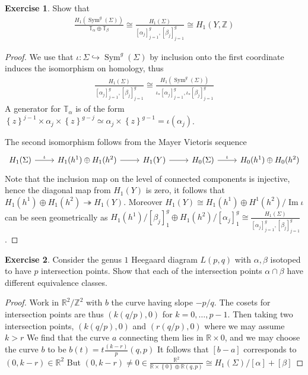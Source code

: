 \documentclass[10.5pt]{article}
\theoremstyle{definition}
\newtheorem{pb}{Exercise}
\numberwithin{proposition}{subsection}
\numberwithin{pb}{subsection}
\newcommand{\set}[1]{\left\{#1\right\}}
\begin{document}
    \begin{pb}
        Show that
        \begin{align}
            \frac{H_1(\operatorname{Sym}^g(\Sigma))}{\mathbb{T}_\alpha \oplus \mathbb{T}_\beta} \cong \frac{H_1(\Sigma)}{[\alpha_j]_{j=1}^g, [\beta_j]_{j=1}^g} \cong H_1(Y,\mathbb{Z})
        \end{align}
        \begin{proof}
            We use that \(\iota: \Sigma \hookrightarrow \operatorname{Sym}^g(\Sigma)\) by inclusion onto the first coordinate induces the isomorphism on homology, thus
            \begin{align}
                \frac{H_1(\Sigma)}{[\alpha_j]_{j=1}^g, [\beta_j]_{j=1}^g} \cong \frac{H_1(\operatorname{Sym}^g(\Sigma))}{\iota_*[\alpha_j]_{j=1}^g, \iota_*[\beta_j]_{j=1}^g}
            \end{align}
            A generator for \(\mathbb{T}_\alpha\) is of the form \(\set{z}^{j-1}\times \alpha_j \times \set{z}^{g-j} \simeq \alpha_j \times \set{z}^{g-1} = \iota(\alpha_j)\).

            The second isomorphism follows from the Mayer Vietoris sequence
            \begin{equation}\begin{tikzcd}
                H_1(\Sigma) \arrow[r, "\iota"] &H_1(h^1) \oplus H_1(h^2) \arrow[r] &H_1(Y) \arrow[r] &H_0(\Sigma) \arrow[r, "\iota"] &H_0(h^1) \oplus H_0(h^2)
            \end{tikzcd}\end{equation}
            Note that the inclusion map on the level of connected components is injective, hence the diagonal map from \(H_1(Y)\) is zero, it follows that \(H_1(h^1) \oplus H_1(h^2) \twoheadrightarrow H_1(Y)\). Moreover \(H_1(Y) \cong H_1(h^1) \oplus H^1(h^2)/\operatorname{Im}\iota\) can be seen geometrically as \(H_1(h^1)/[\beta_j]_1^g \oplus H_1(h^2)/[\alpha_j]_1^g \cong \frac{H_1(\Sigma)}{[\alpha_j]_{j=1}^g, [\beta_j]_{j=1}^g}\).
        \end{proof}
    \end{pb}

    \begin{pb}
        Consider the genus \(1\) Heegaard diagram \(L(p,q)\) with \(\alpha,\beta\) isotoped to have \(p\) intersection points. Show that each of the intersection points \(\alpha \cap \beta\) have different equivalence classes.

        \begin{proof}
            Work in \(\mathbb{R}^2/\mathbb{Z}^2\) with \(b\) the curve having slope \(-p/q\). The cosets for intersection points are thus \((k(q/p),0)\) for \(k=0,\hdots,p-1\). Then taking two intersection points, \((k(q/p),0)\) and \((r(q/p),0)\) where we may assume \(k>r\) We find that the curve \(a\) connecting them lies in \(\mathbb{R} \times 0\), and we may choose the curve \(b\) to be \(b(t) = t\frac{(k-r)}{p}(q,p)\) It follows that \([b-a]\) corresponds to \((0,k-r) \in \mathbb{R}^2\)
            But \((0,k-r) \neq 0 \in \frac{\mathbb{R}^2}{\mathbb{R} \times \set{0} \oplus \mathbb{R}(q,p)} \cong H_1(\Sigma)/[\alpha] + [\beta]\)
        \end{proof}
    \end{pb}
\end{document}
